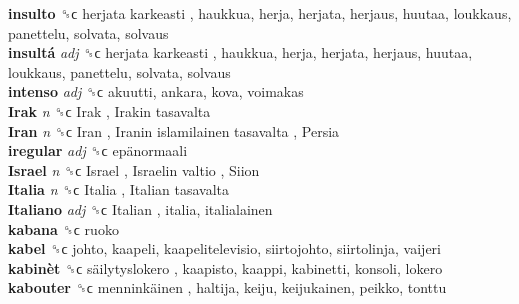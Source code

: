 \textbf{insulto} ␝ϲ   herjata karkeasti , haukkua, herja, herjata, herjaus, huutaa, loukkaus, panettelu, solvata, solvaus  \\
\textbf{insultá} \emph{adj}  ␝ϲ   herjata karkeasti , haukkua, herja, herjata, herjaus, huutaa, loukkaus, panettelu, solvata, solvaus  \\
\textbf{intenso} \emph{adj}  ␝ϲ  akuutti, ankara, kova, voimakas  \\
\textbf{Irak} \emph{n}  ␝ϲ   Irak ,  Irakin tasavalta   \\
\textbf{Iran} \emph{n}  ␝ϲ   Iran ,  Iranin islamilainen tasavalta ,  Persia   \\
\textbf{iregular} \emph{adj}  ␝ϲ   epänormaali   \\
\textbf{Israel} \emph{n}  ␝ϲ   Israel ,  Israelin valtio ,  Siion   \\
\textbf{Italia} \emph{n}  ␝ϲ   Italia ,  Italian tasavalta   \\
\textbf{Italiano} \emph{adj}  ␝ϲ   Italian , italia, italialainen  \\
\textbf{kabana} ␝ϲ  ruoko  \\
\textbf{kabel} ␝ϲ  johto, kaapeli, kaapelitelevisio, siirtojohto, siirtolinja, vaijeri  \\
\textbf{kabinèt} ␝ϲ   säilytyslokero , kaapisto, kaappi, kabinetti, konsoli, lokero  \\
\textbf{kabouter} ␝ϲ   menninkäinen , haltija, keiju, keijukainen, peikko, tonttu  \\
